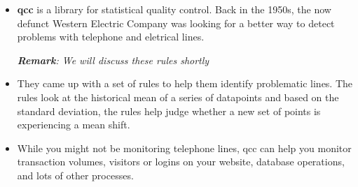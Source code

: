 \documentclass[]{report}
\begin{document}
{\large
	\begin{itemize}
		\item \textbf{qcc} is a library for statistical quality control. Back in the 1950s, the now defunct Western Electric Company was looking for a better way to detect problems with telephone and eletrical lines.
		
		\subitem \textit{\textbf{Remark}: We will discuss these rules shortly}
		
		\item They came up with a set of rules to help them identify problematic lines. The rules look at the historical mean of a series of datapoints and based on the standard deviation, the rules help judge whether a new set of points is experiencing a mean shift.
		
		
		\item While you might not be monitoring telephone lines, qcc can help you monitor transaction volumes, visitors or logins on your website, database operations, and lots of other processes.
	\end{itemize}}
\end{document}
